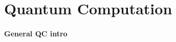 
\chapter{Quantum Computation}
\label{chap:quantumComputation}
%

\subsubsection{General QC intro}

%
%
%
%
%
